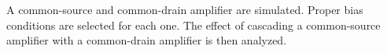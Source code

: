 A common-source and common-drain amplifier are simulated.
Proper bias conditions are selected for each one.
The effect of cascading a common-source amplifier with a common-drain amplifier is then analyzed.
